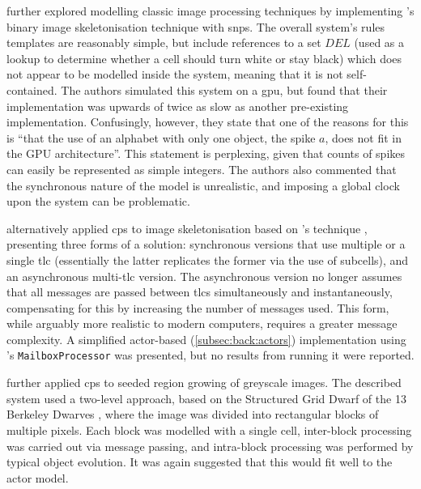 \citeauthor{Diaz-Pernil2013a} \cite{Diaz-Pernil2013a} further explored modelling classic image processing techniques by implementing \citeauthor{Guo1989}'s binary image skeletonisation technique \cite{Guo1989} with \gls{snps}.  The overall system's rules templates are reasonably simple, but include references to a set \(\mathit{DEL}\) (used as a lookup to determine whether a cell should turn white or stay black) which does not appear to be modelled inside the system, meaning that it is not self-contained.  The authors simulated this system on a \gls{gpu}, but found that their implementation was upwards of twice as slow as another pre-existing implementation.  Confusingly, however, they state that one of the reasons for this is \enquote{that the use of an alphabet with only one object, the spike \(a\), does not fit in the GPU architecture}.  This statement is perplexing, given that counts of spikes can easily be represented as simple integers.  The authors also commented that the synchronous nature of the model is unrealistic, and imposing a global clock upon the system can be problematic.

\citeauthor{Nicolescu2014} \cite{Nicolescu2014} alternatively applied \gls{cps} to image skeletonisation based on \citeauthor{Guo1989}'s technique \cite{Guo1989}, presenting three forms of a solution: synchronous versions that use multiple or a single \gls{tlc} (essentially the latter replicates the former via the use of subcells), and an asynchronous multi-\gls{tlc} version.  The asynchronous version no longer assumes that all messages are passed between \glspl{tlc} simultaneously and instantaneously, compensating for this by increasing the number of messages used.  This form, while arguably more realistic to modern computers, requires a greater message complexity. A simplified \gls{actor}-based (\vref{subsec:back:actors}) implementation using \fsharp{}'s \texttt{MailboxProcessor} \cite[ch.~11]{Syme2015a} was presented, but no results from running it were reported.

\citeauthor{Nicolescu2015} \cite{Nicolescu2015} further applied \gls{cps} to seeded region growing of greyscale images.  The described system used a two-level approach, based on the \textsf{Structured Grid Dwarf} of the 13 Berkeley Dwarves \cite{Asanovic2006}, where the image was divided into rectangular blocks of multiple pixels.  Each block was modelled with a single cell, inter-block processing was carried out via message passing, and intra-block processing was performed by typical object evolution.  It was again suggested that this would fit well to the \gls{actor} model.

